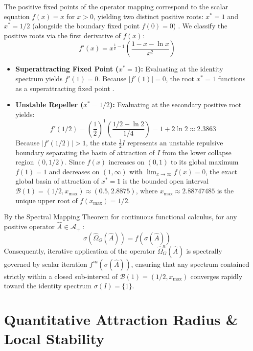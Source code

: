 \documentclass[11pt,a4paper]{article}
\begin{document}
The positive fixed points of the operator mapping correspond to the scalar equation $f(x) = x$ for $x > 0$, yielding two distinct positive roots: $x^* = 1$ and $x^* = 1/2$ (alongside the boundary fixed point $f(0) = 0$) \cite{Murphy}. We classify the positive roots via the first derivative of $f(x)$:
\begin{equation}
f'(x) = x^{\frac{1}{x}-1}\left(\frac{1 - x - \ln x}{x^2}\right)
\end{equation}
\begin{itemize}
    \item \textbf{Superattracting Fixed Point ($x^* = 1$):} Evaluating at the identity spectrum yields $f'(1) = 0$. Because $|f'(1)| = 0$, the root $x^* = 1$ functions as a superattracting fixed point \cite{Murphy,Milnor}.
    \item \textbf{Unstable Repeller ($x^* = 1/2$):} Evaluating at the secondary positive root yields:
    \begin{equation}
    f'(1/2) = \left(\frac{1}{2}\right)^1 \left(\frac{1/2 + \ln 2}{1/4}\right) = 1 + 2\ln 2 \approx 2.3863
    \end{equation}
    Because $|f'(1/2)| > 1$, the state $\frac{1}{2}I$ represents an unstable repulsive boundary separating the basin of attraction of $I$ from the lower collapse region $(0, 1/2)$. Since $f(x)$ increases on $(0, 1)$ to its global maximum $f(1) = 1$ and decreases on $(1, \infty)$ with $\lim_{x \to \infty} f(x) = 0$, the exact global basin of attraction of $x^* = 1$ is the bounded open interval $\mathcal{B}(1) = (1/2, x_{\max}) \approx (0.5, 2.8875)$, where $x_{\max} \approx 2.88747485$ is the unique upper root of $f(x_{\max}) = 1/2$.
\end{itemize}

By the Spectral Mapping Theorem for continuous functional calculus, for any positive operator $\hat{A} \in \mathcal{A}_+$ \cite{Murphy,Pedersen}:
\begin{equation}
\sigma(\hat{\Omega}_G(\hat{A})) = f(\sigma(\hat{A}))
\end{equation}
Consequently, iterative application of the operator $\hat{\Omega}_G^n(\hat{A})$ is spectrally governed by scalar iteration $f^{\circ n}(\sigma(\hat{A}))$, ensuring that any spectrum contained strictly within a closed sub-interval of $\mathcal{B}(1) = (1/2, x_{\max})$ converges rapidly toward the identity spectrum $\sigma(I) = \{1\}$.

\section{Quantitative Attraction Radius \& Local Stability}
\end{document}
